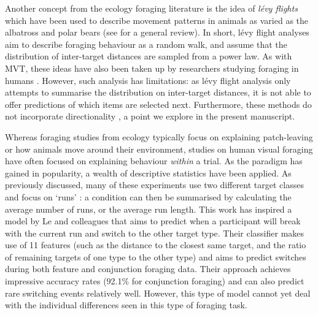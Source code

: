 \documentclass[man, floatsintext]{apa7}
\begin{document}
Another concept from the ecology foraging literature is the idea of \textit{l\'evy flights} which have been used to describe movement patterns in animals as varied as the albatross \citep{viswanathan1996levy} and polar bears \citep{auger2016evaluating} (see \cite{kamaruzaman2013levy} for a general review). In short, l\'evy flight analyses aim to describe foraging behaviour as a random walk, and assume that the distribution of inter-target distances are sampled from a power law. As with MVT, these ideas have also been taken up by researchers studying foraging in humans \citep{garg2021}. However, such analysis has limitations: as l\'evy flight analysis only attempts to summarise the distribution on inter-target distances, it is not able to offer predictions of which items are selected next. Furthermore, these methods do not incorporate directionality \cite{pyke2015understanding}, a point we explore in the present manuscript. 

Whereas foraging studies from ecology typically focus on explaining patch-leaving or how animals move around their environment, studies on human visual foraging have often focused on explaining behaviour \textit{within} a trial. As the paradigm has gained in popularity, a wealth of descriptive statistics have been applied. As previously discussed, many of these experiments use two different target classes and focus on `runs' \citep{dawkins1971, kristjansson2014}: a condition can then be summarised by calculating the average number of runs, or the average run length. This work has inspired a model by Le and colleagues \cite{le2021} that aims to predict when a participant will break with the current run and switch to the other target type. Their classifier makes use of 11 features (such as the distance to the closest same target, and the ratio of remaining targets of one type to the other type) and aims to predict switches during both feature and conjunction foraging data. Their approach achieves impressive accuracy rates (92.1\% for conjunction foraging) and can also predict rare switching events relatively well. However, this type of model cannot yet deal with the individual differences seen in this type of foraging task.
\end{document}
